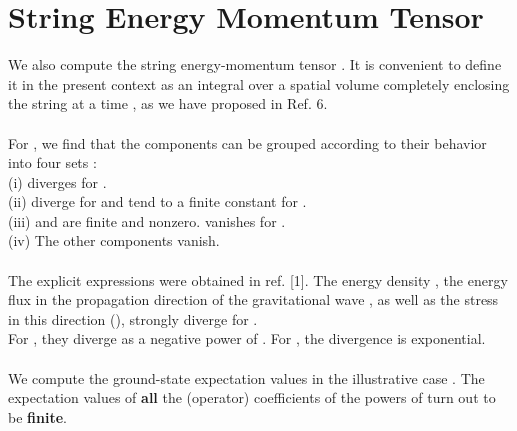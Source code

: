 \documentclass[12pt,a4paper]{article}
\begin{document}
\section{String Energy Momentum Tensor}
We also compute the string energy-momentum tensor \coordHE{}. It is convenient to define 
it in the present context as an integral over a spatial volume completely 
enclosing the string at a time \coordHE{}, as we have proposed in Ref. 6. \\ \\
For \coordHE{}, we find that the \coordHE{} components 
can be grouped according to their \coordHE{} behavior into four 
sets : \\ (i) \coordHE{} diverges for \coordHE{}.\\ (ii) 
\coordHE{} diverge for \coordHE{} and tend 
to a finite constant for \coordHE{}.\\ (iii) 
\coordHE{} and 
\coordHE{} are finite and nonzero. \coordHE{} vanishes for 
\coordHE{}.\\ (iv) The other components vanish. \\ \\
The explicit expressions were obtained in ref. [1]. The energy density 
\coordHE{}, the energy flux in the propagation direction of the 
gravitational wave \coordHE{}, as well as the stress in this 
direction (\coordHE{}), strongly diverge for \coordHE{}. \\ 
For \coordHE{}, they diverge as a negative power of \myHighlight{$\tau $}\coordHE{}. For \coordHE{}, the divergence is exponential. \\ \\
We compute the ground-state expectation values in the illustrative case 
\coordHE{}. The expectation values of {\bf all} the (operator) 
coefficients of 
the powers of \myHighlight{$\tau $}\coordHE{} turn out to be {\bf finite}. \\ \\
\end{document}
